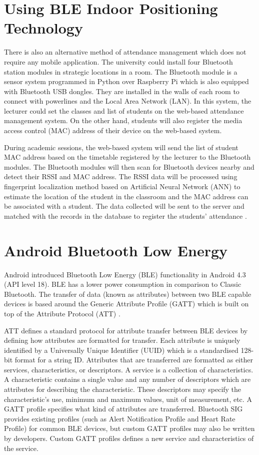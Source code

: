 \documentclass[../report.tex]{subfiles}
\begin{document}
\section{Using BLE Indoor Positioning Technology}
There is also an alternative method of attendance management which does not require any mobile application. The university could install four Bluetooth station modules in strategic locations in a room. The Bluetooth module is a sensor system programmed in Python over Raspberry Pi which is also equipped with Bluetooth USB dongles. They are installed in the walls of each room to connect with powerlines and the Local Area Network (LAN). In this system, the lecturer could set the classes and list of students on the web-based attendance management system. On the other hand, students will also register the media access control (MAC) address of their device on the web-based system.

During academic sessions, the web-based system will send the list of student MAC address based on the timetable registered by the lecturer to the Bluetooth modules. The Bluetooth modules will then scan for Bluetooth devices nearby and detect their RSSI and MAC address. The RSSI data will be processed using fingerprint localization method based on Artificial Neural Network (ANN) to estimate the location of the student in the classroom and the MAC address can be associated with a student. The data collected will be sent to the server and matched with the records in the database to register the students’ attendance \cite{info11060329}.

\section{Android Bluetooth Low Energy}
Android introduced Bluetooth Low Energy (BLE) functionality in Android 4.3 (API level 18). BLE has a lower power consumption in comparison to Classic Bluetooth. The transfer of data (known as attributes) between two BLE capable devices is based around the Generic Attribute Profile (GATT) which is built on top of the Attribute Protocol (ATT) \cite{android-ble}. 

ATT defines a standard protocol for attribute transfer between BLE devices by defining how attributes are formatted for transfer. Each attribute is uniquely identified by a Universally Unique Identifier (UUID) which is a standardised 128-bit format for a string ID. Attributes that are transferred are formatted as either services, characteristics, or descriptors. A service is a collection of characteristics. A characteristic contains a single value and any number of descriptors which are attributes for describing the characteristic. These descriptors may specify the characteristic’s use, minimum and maximum values, unit of measurement, etc.
A GATT profile specifies what kind of attributes are transferred. Bluetooth SIG provides existing profiles (such as Alert Notification Profile and Heart Rate Profile) for common BLE devices, but custom GATT profiles may also be written by developers. Custom GATT profiles defines a new service and characteristics of the service.
\end{document}
